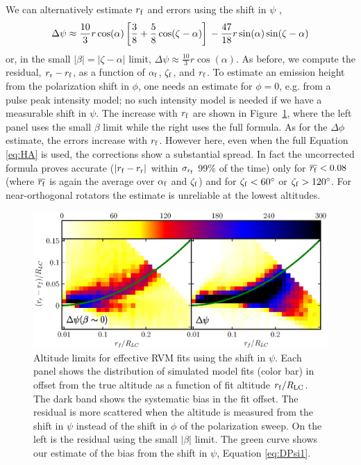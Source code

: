 We can alternatively estimate $r_{\rm{f}}$ and errors using the shift in $\psi$ \citep{hibschman2001polarization},
\begin{equation}\label{eq:HA}
\Delta\psi \approx \frac{10}{3} r \cos(\alpha) \left[\frac{3}{8}+\frac{5}{8} \cos(\zeta-\alpha)\right]\\
- \frac{47}{18} r \sin(\alpha) \sin(\zeta-\alpha)
\end{equation}
or, in the small $|\beta|=|\zeta-\alpha|$ limit, $\Delta\psi\approx \frac{10}{3} r \cos(\alpha)$.
As before, we compute the residual, $r_{\rm{r}}-r_{\rm{f}}$, as a function of $\alpha_{\rm{f}}$, $\zeta_{\rm{f}}$, 
and $r_{\rm{f}}$. To estimate an emission height from the polarization shift in $\phi$,
one needs an estimate for $\phi=0$, e.g. from a pulse peak intensity model; no such intensity
model is needed if we have a measurable shift in $\psi$.
The increase with $r_{\rm{f}}$ are shown in Figure~\ref{fig:totDirFitPsy},
where the left panel uses the small $\beta$ limit while the right uses the full formula.
As for the $\Delta\phi$ estimate, the errors increase with $r_{\rm{f}}$. However here, even
when the full Equation \ref{eq:HA} is used, the corrections show a substantial spread.
In fact the uncorrected formula proves accurate ($|r_{\rm{f}}-r_{\rm{r}}|$ within $\sigma_{r_{\rm{f}}}$ 99\% of the
time) only for $\overline{r_{\rm{f}}} < 0.08$ (where $\overline{r_{\rm{f}}}$ is again 
the average over $\alpha_{\rm{f}}$ and $\zeta_{\rm{f}}$)
and for $\zeta_{\rm{f}} <60^\circ$ or $\zeta_{\rm{f}} >120^\circ$. 
For near-orthogonal rotators the estimate is unreliable at the lowest altitudes.

\begin{figure}[t!!]
\begin{center}
\includegraphics[width=.9\textwidth]{chapters/BCWlimitations/figures/totDirFitPsy.eps}
\caption[Altitude limits for effective RVM fits using the shift in $\psi$]{
Altitude limits for effective RVM fits using the shift in $\psi$.  Each panel shows the distribution
of simulated model fits (color bar) in offset from the true altitude as a function
of fit altitude $r_{\rm{f}}/R_{\rm{LC}}$. The dark band shows the systematic bias in the
fit offset. 
The residual is more scattered when the altitude is measured from 
the shift in $\psi$ instead of the shift in $\phi$ of the polarization
sweep. 
On the left is the residual using the small $|\beta|$ limit.
The green curve shows our estimate of the bias from the 
shift in $\psi$, Equation \ref{eq:DPsi1}.
}
\label{fig:totDirFitPsy}
\end{center}
\end{figure}

